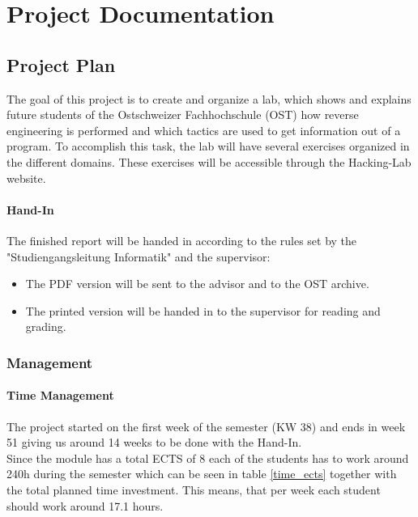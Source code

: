 \chapter{Project Documentation}
\section{Project Plan}
The goal of this project is to create and organize a lab, which shows and explains future students of the Ostschweizer Fachhochschule (OST) how reverse engineering is performed and which tactics are used to get information out of a program. To accomplish this task, the lab will have several exercises organized in the different domains. These exercises will be accessible through the Hacking-Lab website. 

\subsubsection*{Hand-In}
The finished report will be handed in according to the rules set by the "Studiengangsleitung Informatik" and the supervisor:
\begin{itemize}
    \item The PDF version will be sent to the advisor and to the OST archive.
    \item The printed version will be handed in to the supervisor for reading and grading.
\end{itemize}

\subsection{Management}
\subsubsection*{Time Management}
The project started on the first week of the semester (KW 38) and ends in week 51 giving us around 14 weeks to be done with the Hand-In. \\
Since the module has a total ECTS of 8 each of the students has to work around 240h during the semester which can be seen in table \ref{time_ects} together with the total planned time investment. This means, that per week each student should work around 17.1 hours.

